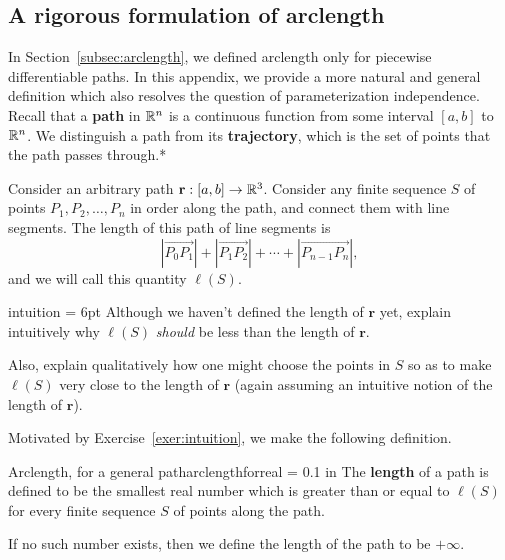 \documentclass{watsonbook}
\begin{document}

\newpage 

  \subsection{A rigorous formulation of arclength}
  \label{sec:arclengthappendix}

  In Section~\ref{subsec:arclength}, we defined arclength only for
  piecewise differentiable paths. In this appendix, we provide a more
  natural and general definition which also resolves the question of
  parameterization independence. Recall that a \textbf{path} in $\mathbb{R}^n$
  is a continuous function from some interval $[a,b]$ to $\mathbb{R}^n$. We
  distinguish a path from its \textbf{trajectory}, which is the set of
  points that the path passes through.* 

  Consider an arbitrary path $\mathbf{r}:[a,b] \to \mathbb{R}^3$. Consider any finite sequence
  $S$ of points $P_1, P_2, \ldots, P_n$ in order along the path, and
  connect them with line segments. The length of this path of line
  segments is
  \[
    |\overrightarrow{P_0P_1}| +
    |\overrightarrow{P_1P_2}| + \cdots +
    |\overrightarrow{P_{n-1}P_n}|, 
  \]
  and we will call this quantity $\ell(S)$.

  \begin{exercise}{}{intuition} \parskip = 6pt 
    Although we haven't defined the length of $\mathbf{r}$ yet, explain
    intuitively why $\ell(S)$ \textit{should} be less than the length of
    $\mathbf{r}$.

    Also, explain qualitatively how one might choose the points in $S$
    so as to make $\ell(S)$ very close to the length of $\mathbf{r}$
    (again assuming an intuitive notion of the length of $\mathbf{r}$).
  \end{exercise}

  Motivated by Exercise~\ref{exer:intuition}, we make the following
  definition.  

  \begin{defn}{Arclength, for a general path}{arclengthforreal}
    \parskip = 0.1 in 
    The \textbf{length} of a path is defined to be the smallest real
    number which is greater than or equal to $\ell(S)$ for every
    finite sequence $S$ of points along the path.

    If no such number exists, then we define the length of the path to be
    $+\infty$. 
  \end{defn}
  
\end{document}
